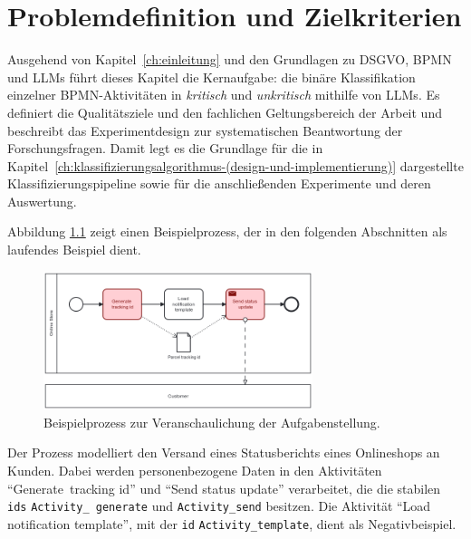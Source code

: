 \chapter{Problemdefinition und Zielkriterien}\label{ch:problemdefinition-und-zielkriterien}

Ausgehend von Kapitel~\ref{ch:einleitung} und den Grundlagen zu \ac{DSGVO}, \ac{BPMN} und \acp{LLM} führt dieses Kapitel die Kernaufgabe: die binäre Klassifikation einzelner \ac{BPMN}-Aktivitäten in \emph{kritisch} und \emph{unkritisch} mithilfe von \acp{LLM}. Es definiert die Qualitätsziele und den fachlichen Geltungsbereich der Arbeit und beschreibt das Experimentdesign zur systematischen Beantwortung der Forschungsfragen. Damit legt es die Grundlage für die in Kapitel~\ref{ch:klassifizierungsalgorithmus-(design-und-implementierung)} dargestellte Klassifizierungspipeline sowie für die anschließenden Experimente und deren Auswertung.

Abbildung \ref{fig:running_example} zeigt einen Beispielprozess, der in den folgenden Abschnitten als laufendes Beispiel dient.

\begin{figure}[h]
    \centering
    \includegraphics[width=0.7\textwidth]{images/running_example_en}
    \caption{Beispielprozess zur Veranschaulichung der Aufgabenstellung.}
    \label{fig:running_example}
\end{figure}

Der Prozess modelliert den Versand eines Statusberichts eines Onlineshops an Kunden. Dabei werden personenbezogene Daten in den Aktivitäten \enquote{Generate\linebreak~tracking id} und \enquote{Send status update} verarbeitet, die die stabilen \texttt{ids} \texttt{Activity\_\linebreak~generate} und \texttt{Activity\_send} besitzen. Die Aktivität \enquote{Load notification template}, mit der \texttt{id} \texttt{Activity\_template}, dient als Negativbeispiel.





